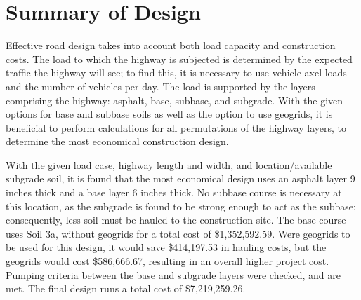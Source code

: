 \documentclass{article}
\begin{document}

\newpage
\doublespacing
\tableofcontents
\newpage
{}
\listoftables
{}
\listoffigures
\newpage
\section{Summary of Design} 
\par Effective road design takes into account both load capacity and construction costs. The load to which the highway is subjected is determined by the expected traffic the highway will see; to find this, it is necessary to use vehicle axel loads and the number of vehicles per day. The load is supported by the layers comprising the highway: asphalt, base, subbase, and subgrade. With the given options for base and subbase soils as well as the option to use geogrids, it is beneficial to perform calculations for all permutations of the highway layers, to determine the most economical construction design.
\par With the given load case, highway length and width, and location/available subgrade soil, it is found that the most economical design uses an asphalt layer 9 inches thick and a base layer 6 inches thick. No subbase course is necessary at this location, as the subgrade is found to be strong enough to act as the subbase; consequently, less soil must be hauled to the construction site. The base course uses Soil 3a, without geogrids for a total cost of \$1,352,592.59. Were geogrids to be used for this design, it would save \$414,197.53 in hauling costs, but the geogrids would cost \$586,666.67, resulting in an overall higher project cost. Pumping criteria between the base and subgrade layers were checked, and are met. The final design runs a total cost of \$7,219,259.26. 

\newpage
\end{document}
